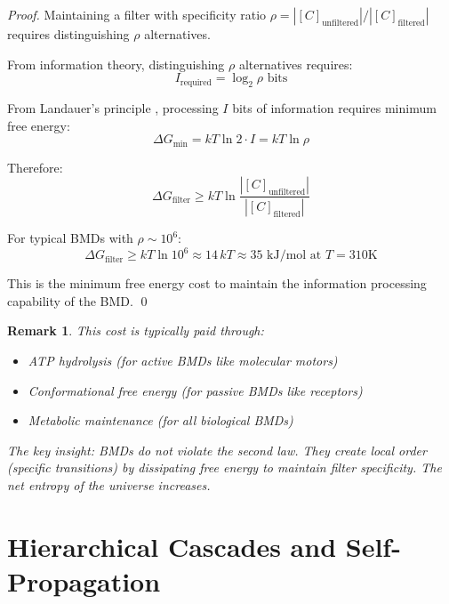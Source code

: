 \documentclass[12pt,a4paper]{article}
\newtheorem{remark}{Remark}
\begin{document}
\begin{proof}
Maintaining a filter with specificity ratio $\rho = |[C]_{\text{unfiltered}}|/|[C]_{\text{filtered}}|$ requires distinguishing $\rho$ alternatives.

From information theory, distinguishing $\rho$ alternatives requires:
\begin{equation}
I_{\text{required}} = \log_2 \rho \text{ bits}
\end{equation}

From Landauer's principle \cite{landauer1961irreversibility}, processing $I$ bits of information requires minimum free energy:
\begin{equation}
\Delta G_{\text{min}} = kT \ln 2 \cdot I = kT \ln \rho
\end{equation}

Therefore:
\begin{equation}
\Delta G_{\text{filter}} \geq kT \ln \frac{|[C]_{\text{unfiltered}}|}{|[C]_{\text{filtered}}|}
\end{equation}

For typical BMDs with $\rho \sim 10^6$:
\begin{equation}
\Delta G_{\text{filter}} \geq kT \ln 10^6 \approx 14 \, kT \approx 35 \text{ kJ/mol at } T = 310\text{K}
\end{equation}

This is the minimum free energy cost to maintain the information processing capability of the BMD. \qed
\end{proof}

\begin{remark}
This cost is typically paid through:
\begin{itemize}
\item ATP hydrolysis (for active BMDs like molecular motors)
\item Conformational free energy (for passive BMDs like receptors)
\item Metabolic maintenance (for all biological BMDs)
\end{itemize}

The key insight: BMDs do not violate the second law. They create local order (specific transitions) by dissipating free energy to maintain filter specificity. The net entropy of the universe increases.
\end{remark}

\section{Hierarchical Cascades and Self-Propagation}
\end{document}
